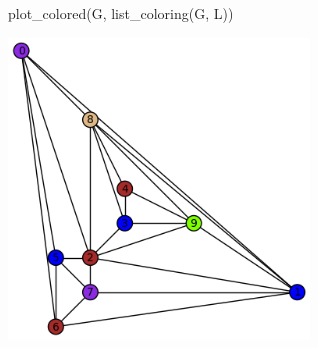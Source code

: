 \begin{sageCell}
    plot_colored(G, list_coloring(G, L))
\end{sageCell}

\begin{outImage}
   \includegraphics[width=0.6\textwidth]{Images/ListColoring/planar_graph.png}
\end{outImage}
